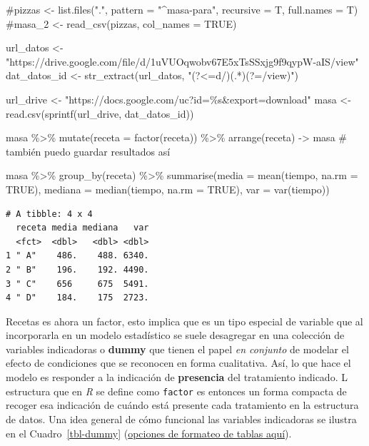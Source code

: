 \documentclass[
  letterpaper,
  DIV=11,
  numbers=noendperiod]{scrartcl}
\newenvironment{Shaded}{\begin{snugshade}}{\end{snugshade}}
\newcommand{\AttributeTok}[1]{\textcolor[rgb]{0.40,0.45,0.13}{#1}}
\newcommand{\CommentTok}[1]{\textcolor[rgb]{0.37,0.37,0.37}{#1}}
\newcommand{\ConstantTok}[1]{\textcolor[rgb]{0.56,0.35,0.01}{#1}}
\newcommand{\FunctionTok}[1]{\textcolor[rgb]{0.28,0.35,0.67}{#1}}
\newcommand{\NormalTok}[1]{\textcolor[rgb]{0.00,0.23,0.31}{#1}}
\newcommand{\OtherTok}[1]{\textcolor[rgb]{0.00,0.23,0.31}{#1}}
\newcommand{\SpecialCharTok}[1]{\textcolor[rgb]{0.37,0.37,0.37}{#1}}
\newcommand{\StringTok}[1]{\textcolor[rgb]{0.13,0.47,0.30}{#1}}
\begin{document}
\begin{Shaded}
\begin{Highlighting}[]
\CommentTok{\#pizzas \textless{}{-} list.files(".", pattern = "\^{}masa{-}para", recursive = T, full.names = T)}
\CommentTok{\#masa\_2 \textless{}{-} read\_csv(pizzas, col\_names = TRUE)}

\NormalTok{url\_datos }\OtherTok{\textless{}{-}} \StringTok{"https://drive.google.com/file/d/1uVUOqwobv67E5xTsSSxjg9f9qypW{-}aIS/view"}
\NormalTok{dat\_datos\_id }\OtherTok{\textless{}{-}} \FunctionTok{str\_extract}\NormalTok{(url\_datos, }\StringTok{"(?\textless{}=d/)(.*)(?=/view)"}\NormalTok{)}

\NormalTok{url\_drive }\OtherTok{\textless{}{-}} \StringTok{"https://docs.google.com/uc?id=\%s\&export=download"} 
\NormalTok{masa }\OtherTok{\textless{}{-}} \FunctionTok{read.csv}\NormalTok{(}\FunctionTok{sprintf}\NormalTok{(url\_drive, dat\_datos\_id)) }

\NormalTok{masa }\SpecialCharTok{\%\textgreater{}\%}
  \FunctionTok{mutate}\NormalTok{(}\AttributeTok{receta =} \FunctionTok{factor}\NormalTok{(receta)) }\SpecialCharTok{\%\textgreater{}\%}            
  \FunctionTok{arrange}\NormalTok{(receta) }\OtherTok{{-}\textgreater{}}\NormalTok{ masa }\CommentTok{\# también puedo guardar resultados así}

\NormalTok{masa }\SpecialCharTok{\%\textgreater{}\%} 
  \FunctionTok{group\_by}\NormalTok{(receta) }\SpecialCharTok{\%\textgreater{}\%} 
  \FunctionTok{summarise}\NormalTok{(}\AttributeTok{media =} \FunctionTok{mean}\NormalTok{(tiempo, }\AttributeTok{na.rm =} \ConstantTok{TRUE}\NormalTok{), }
            \AttributeTok{mediana =} \FunctionTok{median}\NormalTok{(tiempo, }\AttributeTok{na.rm =} \ConstantTok{TRUE}\NormalTok{),}
            \AttributeTok{var =} \FunctionTok{var}\NormalTok{(tiempo)) }
\end{Highlighting}
\end{Shaded}

\begin{verbatim}
# A tibble: 4 x 4
  receta media mediana   var
  <fct>  <dbl>   <dbl> <dbl>
1 " A"    486.    488. 6340.
2 " B"    196.    192. 4490.
3 " C"    656     675  5491.
4 " D"    184.    175  2723.
\end{verbatim}

Recetas es ahora un factor, esto implica que es un tipo especial de
variable que al incorporarla en un modelo estadístico se suele
desagregar en una colección de variables indicadoras o \textbf{dummy}
que tienen el papel \emph{en conjunto} de modelar el efecto de
condiciones que se reconocen en forma cualitativa. Así, lo que hace el
modelo es responder a la indicación de \textbf{presencia} del
tratamiento indicado. L estructura que en \emph{R} se define como
\texttt{factor} es entonces un forma compacta de recoger esa indicación
de cuándo está presente cada tratamiento en la estructura de datos. Una
idea general de cómo funcional las variables indicadoras se ilustra en
el Cuadro~\ref{tbl-dummy}
(\href{https://quarto.org/docs/authoring/tables.html}{opciones de
formateo de tablas aquí}).
\end{document}
